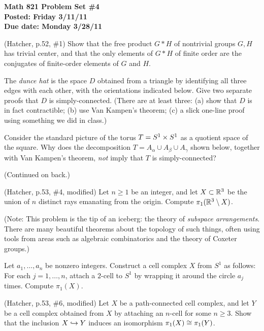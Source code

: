 
\usepackage{youngtab}

\thispagestyle{empty}
{\bf Math 821 Problem Set \#4\\
Posted: Friday 3/11/11\\
Due date: Monday 3/28/11}

\prob (Hatcher, p.52, \#1) Show that the free product $G*H$ of 
nontrivial groups $G,H$ has trivial center, and that the only elements of 
$G*H$ of finite order are the conjugates of finite-order elements of $G$ 
and $H$.

\prob The \emph{dunce hat} is the space $D$ obtained from a triangle
by identifying all three edges with each other, with the orientations
indicated below.  Give two separate proofs that $D$ is simply-connected.
(There are at least three: (a) show that $D$ is in fact contractible;
(b) use Van Kampen's theorem; (c) a slick one-line proof using something
we did in class.)


\prob Consider the standard picture of the torus $T=S^1\times S^1$
as a quotient space of the square.
Why does the decomposition $T=A_\alpha\cup A_\beta\cup A_\gamma$ shown below,
together with Van Kampen's theorem, \emph{not} imply that $T$
is simply-connected?


\bigskip (Continued on back.)
\pagebreak

\prob (Hatcher, p.53, \#4, modified) Let $n\geq 1$ be an integer, and 
let $X\subset\mathbb{R}^3$ be the union of $n$ distinct rays emanating from the 
origin.  Compute $\pi_1(\mathbb{R}^3\setminus X)$.

(Note: This problem is the tip of an iceberg: the theory of 
\emph{subspace arrangements}.  There are many beautiful theorems about 
the topology of such things, often using tools from areas such as 
algebraic combinatorics and the theory of Coxeter groups.)

\prob Let $a_1,\dots,a_n$ be nonzero integers.  
Construct a cell complex $X$ from $S^1$ as follows:
For each $j=1,\dots,n$, attach a $2$-cell to $S^1$ by wrapping
it around the circle $a_j$ times.  Compute $\pi_1(X)$.

\prob (Hatcher, p.53, \#6, modified) Let $X$ be a path-connected cell 
complex, and let $Y$ be a cell complex obtained from $X$ by attaching an 
$n$-cell for some $n\geq 3$.  Show that the inclusion $X\hookrightarrow Y$ induces 
an isomorphism $\pi_1(X)\cong\pi_1(Y)$.


